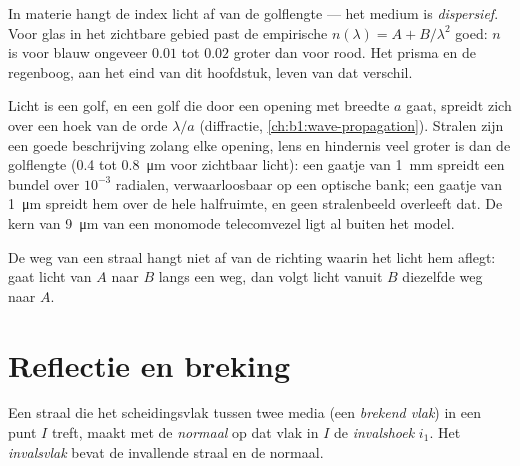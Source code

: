 \begin{remark}[Dispersie]\label{rem:b1:rays-reflection-refraction:dispersion}
In materie hangt de index licht af van de golflengte --- het medium is
\emph{dispersief}. Voor glas in het zichtbare gebied past de empirische  $n(\lambda) = A + B/\lambda^2$ goed: $n$ is voor blauw ongeveer
$0.01$ tot $0.02$ groter dan voor rood. Het prisma en de regenboog, aan het
eind van dit hoofdstuk, leven van dat verschil.
\end{remark}

\begin{remark}\label{rem:b1:rays-reflection-refraction:limits}
Licht is een golf, en een golf die door een opening met breedte $a$ gaat,
spreidt zich over een hoek van de orde $\lambda/a$ (diffractie,
\cref{ch:b1:wave-propagation}). Stralen zijn een goede beschrijving zolang
elke opening, lens en hindernis veel groter is dan de golflengte
(\qty{0.4}{} tot \qty{0.8}{\micro m} voor zichtbaar licht): een gaatje van
\qty{1}{mm} spreidt een bundel over $10^{-3}$ radialen, verwaarloosbaar op een
optische bank; een gaatje van \qty{1}{\micro m} spreidt hem over de hele
halfruimte, en geen stralenbeeld overleeft dat. De kern van \qty{9}{\micro m}
van een monomode telecomvezel ligt al buiten het model.
\end{remark}

\begin{proposition}\label{prop:b1:rays-reflection-refraction:reversibility}
De weg van een straal hangt niet af van de richting waarin het licht hem
aflegt: gaat licht van $A$ naar $B$ langs een weg, dan volgt licht vanuit $B$
diezelfde weg naar $A$.
\end{proposition}
\admitted

\section{Reflectie en breking}

\begin{definition}[Inval]\label{def:b1:rays-reflection-refraction:incidence}
Een straal die het scheidingsvlak tussen twee media (een \emph{brekend vlak})
in een punt $I$ treft, maakt met de \emph{normaal} op dat vlak in $I$ de
\emph{invalshoek} $i_1$. Het \emph{invalsvlak} bevat de invallende straal en
de normaal.
\end{definition}

